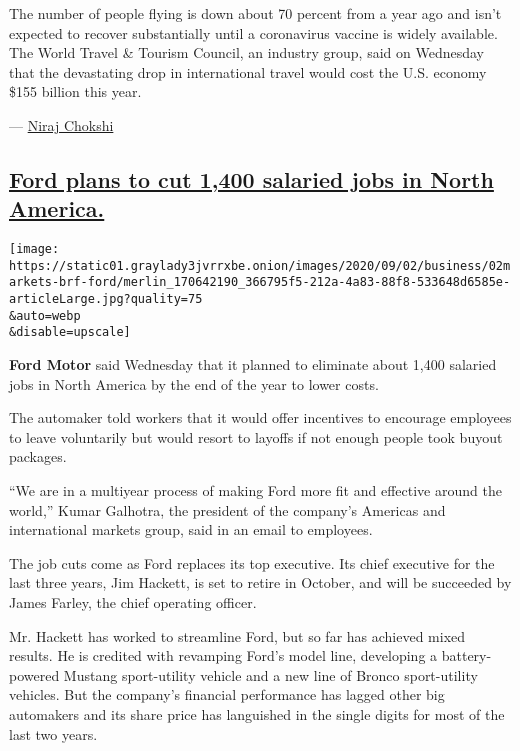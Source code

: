 The number of people flying is down about 70 percent from a year ago and
isn't expected to recover substantially until a coronavirus vaccine is
widely available. The World Travel \& Tourism Council, an industry
group, said on Wednesday that the devastating drop in international
travel would cost the U.S. economy \$155 billion this year.

--- \href{https://www.nytimes3xbfgragh.onion/by/niraj-chokshi}{Niraj
Chokshi}

\hypertarget{ford-plans-to-cut-1400-salaried-jobs-in-north-america}{%
\subsection{\texorpdfstring{\protect\hyperlink{ford-plans-to-cut-1400-salaried-jobs-in-north-america}{Ford
plans to cut 1,400 salaried jobs in North
America.}}{Ford plans to cut 1,400 salaried jobs in North America.}}\label{ford-plans-to-cut-1400-salaried-jobs-in-north-america}}

\texttt{[image: https://static01.graylady3jvrrxbe.onion/images/2020/09/02/business/02markets-brf-ford/merlin\_170642190\_366795f5-212a-4a83-88f8-533648d6585e-articleLarge.jpg?quality=75\\\&auto=webp\\\&disable=upscale]}

\textbf{Ford Motor} said Wednesday that it planned to eliminate about
1,400 salaried jobs in North America by the end of the year to lower
costs.

The automaker told workers that it would offer incentives to encourage
employees to leave voluntarily but would resort to layoffs if not enough
people took buyout packages.

``We are in a multiyear process of making Ford more fit and effective
around the world,'' Kumar Galhotra, the president of the company's
Americas and international markets group, said in an email to employees.

The job cuts come as Ford replaces its top executive. Its chief
executive for the last three years, Jim Hackett, is set to retire in
October, and will be succeeded by James Farley, the chief operating
officer.

Mr. Hackett has worked to streamline Ford, but so far has achieved mixed
results. He is credited with revamping Ford's model line, developing a
battery-powered Mustang sport-utility vehicle and a new line of Bronco
sport-utility vehicles. But the company's financial performance has
lagged other big automakers and its share price has languished in the
single digits for most of the last two years.

